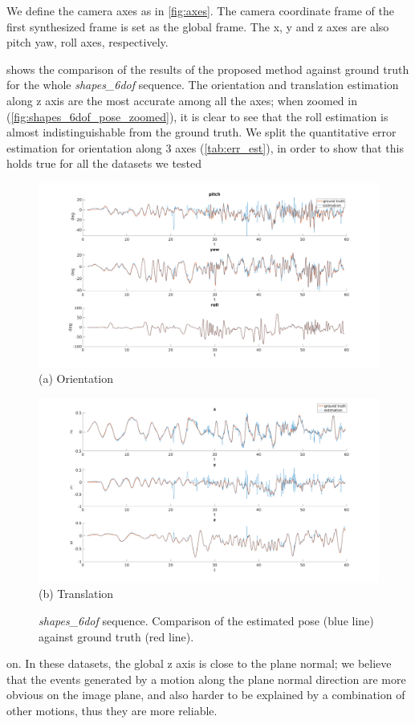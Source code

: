 We define the camera axes as in \cref{fig:axes}. The camera coordinate
frame of the first synthesized frame is set as the global frame. The
x, y and z axes are also pitch yaw, roll axes, respectively.

 shows the comparison of the results of the
proposed method against ground truth for the whole
\textit{shapes\_6dof} sequence. The orientation and translation
estimation along z axis are the most accurate among all the axes; when
zoomed in (\cref{fig:shapes_6dof_pose_zoomed}), it is clear to see
that the roll estimation is almost indistinguishable from the ground
truth. We split the quantitative error estimation for orientation
along 3 axes (\cref{tab:err_est}), in order to show that this holds
true for all the datasets we tested
\begin{figure}[H]
  \begin{minipage}[t]{\textwidth}
    \centering \includegraphics[trim={5cm 0cm 5cm 0cm},clip,width =
    \textwidth]{images/shapes_6dof_rotation.png} (a) Orientation
  \end{minipage}
  \hfill
  \begin{minipage}[t]{\textwidth}
    \centering \includegraphics[trim={5cm 0cm 5cm 0cm},clip,width =
    \textwidth]{images/shapes_6dof_translation.png} (b) Translation
  \end{minipage}
  \hfill
  \caption{\textit{shapes\_6dof} sequence. Comparison of the estimated
    pose (blue line) against ground truth (red line).}
  \label{fig:shapes_6dof_pose}
\end{figure}
on. In these datasets, the global z axis is close to the plane normal;
we believe that the events generated by a motion along the plane
normal direction are more obvious on the image plane, and also harder
to be explained by a combination of other motions, thus they are more
reliable.


